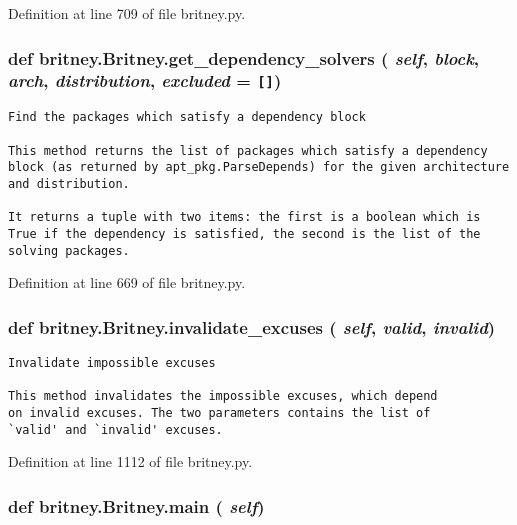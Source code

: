 Definition at line 709 of file britney.py.
\subsubsection{\setlength{\rightskip}{0pt plus 5cm}def britney.Britney.get\_\-dependency\_\-solvers ( {\em self},  {\em block},  {\em arch},  {\em distribution},  {\em excluded} = {\tt []})}\label{classbritney_1_1Britney_5461f49e3e75a251ebedfd37d2a5ff0c}




\footnotesize\begin{verbatim}Find the packages which satisfy a dependency block

This method returns the list of packages which satisfy a dependency
block (as returned by apt_pkg.ParseDepends) for the given architecture
and distribution.

It returns a tuple with two items: the first is a boolean which is
True if the dependency is satisfied, the second is the list of the
solving packages.
\end{verbatim}
\normalsize
 

Definition at line 669 of file britney.py.
\subsubsection{\setlength{\rightskip}{0pt plus 5cm}def britney.Britney.invalidate\_\-excuses ( {\em self},  {\em valid},  {\em invalid})}\label{classbritney_1_1Britney_171969785db449d7a06c3f762774e0cd}




\footnotesize\begin{verbatim}Invalidate impossible excuses

This method invalidates the impossible excuses, which depend
on invalid excuses. The two parameters contains the list of
`valid' and `invalid' excuses.
\end{verbatim}
\normalsize
 

Definition at line 1112 of file britney.py.
\subsubsection{\setlength{\rightskip}{0pt plus 5cm}def britney.Britney.main ( {\em self})}\label{classbritney_1_1Britney_0e9551bdf927388f55be5ce15a48c94f}




